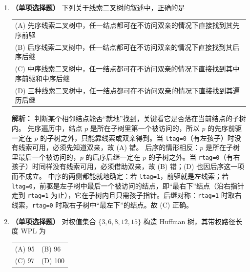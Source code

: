 \begin{enumerate}
\ifshowsolutions\par\noindent\textbf{解析：} 先序首元 \texttt{A} 是根；中序中 \texttt{A} 左侧 \texttt{DBF} 是左子树，右侧 \texttt{ECG} 是右子树。
左子树先序为 \texttt{BDF}、中序为 \texttt{DBF}，故 \texttt{B} 为根，\texttt{D} 为左孩子、\texttt{F} 为右孩子，其后序为 \texttt{DFB}。
右子树先序为 \texttt{CEG}、中序为 \texttt{ECG}，故 \texttt{C} 为根，\texttt{E} 为左孩子、\texttt{G} 为右孩子，其后序为 \texttt{EGC}。
整棵树后序为“左、右、根”，即 \texttt{DFB}+\texttt{EGC}+\texttt{A}=\texttt{DFBEGCA}。
\else \answerarea \fi

\item \textbf{（单项选择题）} 下列关于线索二叉树的叙述中，正确的是
\begin{center}
\begin{tabularx}{0.96\linewidth}{@{}X@{}}
(A) 先序线索二叉树中，任一结点都可在不访问双亲的情况下直接找到其先序前驱 \\[4pt]
(B) 后序线索二叉树中，任一结点都可在不访问双亲的情况下直接找到其后序后继 \\[4pt]
(C) 中序线索二叉树中，任一结点都可在不访问双亲的情况下直接找到其中序前驱和中序后继 \\[4pt]
(D) 三种线索二叉树中，任一结点都可在不访问双亲的情况下直接找到其遍历后继
\end{tabularx}
\end{center}

\ifshowsolutions\par\noindent\textbf{解析：} 判断某个相邻结点能否“就地”找到，关键看它是否落在当前结点的子树内。
先序遍历中，结点 $p$ 是所在子树里第一个被访问的，所以 $p$ 的先序前驱一定在 $p$ 的子树之外，只能靠线索或双亲得到。当 \texttt{ltag=0}（有左孩子）时没有线索可用，必须先知道双亲，故 (A) 错。
后序的情形相反：$p$ 是所在子树里最后一个被访问的，$p$ 的后序后继一定在 $p$ 的子树之外。当 \texttt{rtag=0}（有右孩子）时同样没有线索可用，必须借助双亲，故 (B) 错；(D) 也因后序这一项而不成立。
中序的两侧都能就地确定：若 \texttt{ltag=1}，前驱就是左线索；若 \texttt{ltag=0}，前驱是左子树中最后一个被访问的结点，即“最右下”结点（沿右指针走到 \texttt{rtag=1} 为止），它在子树内且只需孩子指针。后继对称：\texttt{rtag=1} 时取右线索，\texttt{rtag=0} 时取右子树中“最左下”的结点。故 (C) 正确。
\else \answerarea \fi

\item \textbf{（单项选择题）} 对权值集合 $\{3,6,8,12,15\}$ 构造 Huffman 树，其带权路径长度 WPL 为
\begin{center}
\begin{tabular}{ll}
(A) 95 & (B) 96 \\[4pt]
(C) 97 & (D) 100
\end{tabular}
\end{center}


\end{enumerate}
